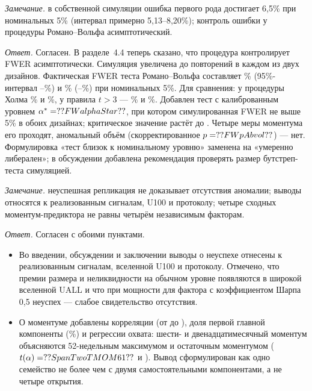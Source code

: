 \documentclass[11pt]{article}
\newcommand{\point}[1]{\par\vspace{10pt}{\large #1}\par\vspace{2pt}}
\newcommand{\remark}[1]{\textit{Замечание.} #1\par}
\newcommand{\answer}{\textit{Ответ.} }
\newcommand{\RW}{Романо--Вольфа}
\begin{document}
\point{5. Надёжность бутстрепа}
\remark{в собственной симуляции ошибка первого рода достигает 6,5\% при номинальных 5\% (интервал примерно
5,13--8,20\%); контроль ошибки у процедуры \RW{} асимптотический.}
\answer Согласен. В разделе~4.4 теперь сказано, что процедура контролирует FWER асимптотически. Симуляция
увеличена до  повторений в каждом из двух дизайнов. Фактическая FWER теста \RW{} составляет
\% (95\%-интервал --\%) и \%
(--\%) при номинальных 5\%. Для сравнения: у процедуры Холма \% и
\%, у правила $t>3$ --- \% и \%. Добавлен тест с калиброванным
уровнем $\alpha^\ast=\val{FWalphaStar}$, при котором симулированная FWER не выше 5\% в обоих дизайнах; критическое
значение растёт до . Четыре меры моментума его проходят, аномальный объём (скорректированное
$p=\val{FWpAbvol}$) --- нет. Формулировка «тест близок к номинальному уровню» заменена на «умеренно либерален»; в
обсуждении добавлена рекомендация проверять размер бутстреп-теста симуляцией.

\point{6. Неуспех репликации и независимость факторов}
\remark{неуспешная репликация не доказывает отсутствия аномалии; выводы относятся к реализованным сигналам, U100
и протоколу; четыре сходных моментум-предиктора не равны четырём независимым факторам.}
\answer Согласен с обоими пунктами.
\begin{itemize}
\item Во введении, обсуждении и заключении выводы о неуспехе отнесены к реализованным сигналам, вселенной U100
и протоколу. Отмечено, что премии размера и неликвидности на обычном уровне появляются в широкой вселенной UALL и
что при мощности  для фактора с коэффициентом Шарпа 0,5 неуспех --- слабое свидетельство
отсутствия.
\item О моментуме добавлены корреляции (от  до ), доля первой главной компоненты
(\%) и регрессии охвата: шести- и двенадцатимесячный моментум объясняются 52-недельным
максимумом и остаточным моментумом ($t(\alpha)=\val{SpanTwoTMOM61}$ и ). Вывод
сформулирован как одно семейство не более чем с двумя самостоятельными компонентами, а не четыре открытия.
\end{itemize}
\end{document}
